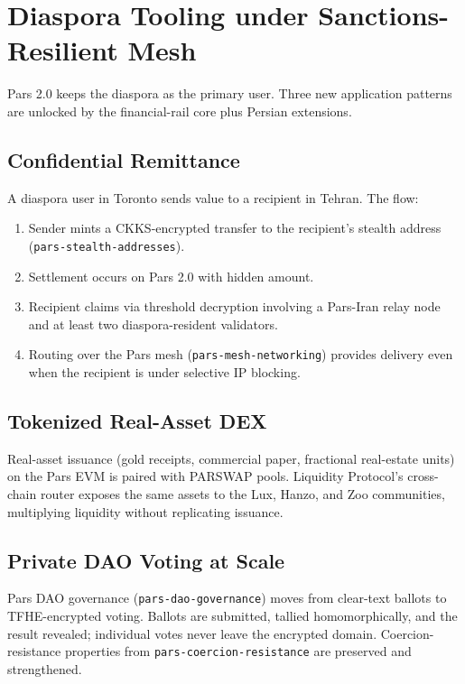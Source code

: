 \documentclass[11pt,a4paper]{article}
\begin{document}
\section{Diaspora Tooling under Sanctions-Resilient Mesh}
\label{sec:diaspora}

Pars 2.0 keeps the diaspora as the primary user. Three new application
patterns are unlocked by the financial-rail core plus Persian extensions.

\subsection{Confidential Remittance}

A diaspora user in Toronto sends value to a recipient in Tehran. The
flow:
\begin{enumerate}[leftmargin=*]
\item Sender mints a CKKS-encrypted transfer to the recipient's stealth
address (\texttt{pars-stealth-addresses}).
\item Settlement occurs on Pars 2.0 with hidden amount.
\item Recipient claims via threshold decryption involving a Pars-Iran
relay node and at least two diaspora-resident validators.
\item Routing over the Pars mesh (\texttt{pars-mesh-networking})
provides delivery even when the recipient is under selective IP
blocking.
\end{enumerate}

\subsection{Tokenized Real-Asset DEX}

Real-asset issuance (gold receipts, commercial paper, fractional
real-estate units) on the Pars EVM is paired with PARSWAP pools.
Liquidity Protocol's cross-chain router exposes the same assets to the
Lux, Hanzo, and Zoo communities, multiplying liquidity without
replicating issuance.

\subsection{Private DAO Voting at Scale}

Pars DAO governance (\texttt{pars-dao-governance}) moves from clear-text
ballots to TFHE-encrypted voting. Ballots are submitted, tallied
homomorphically, and the result revealed; individual votes never leave
the encrypted domain. Coercion-resistance properties from
\texttt{pars-coercion-resistance} are preserved and strengthened.
\end{document}
